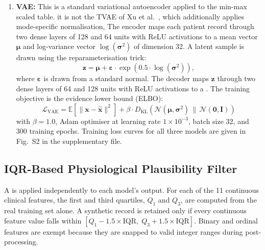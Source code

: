 \begin{enumerate}
\item {\textbf {VAE:}} This is a standard variational autoencoder applied to the min-max scaled table.  it is not the TVAE of Xu et al.\ \cite{xu2019}, which additionally applies mode-specific normalisation,  The encoder maps each patient record through two dense layers of 128 and 64 units with ReLU activations to a mean vector $\boldsymbol{\mu}$ and log-variance vector $\log(\boldsymbol{\sigma}^2)$ of dimension 32. A latent sample is drawn using the reparameterisation trick:
\begin{equation}
\mathbf{z} = \boldsymbol{\mu} + \boldsymbol{\varepsilon} \cdot \exp(0.5 \cdot \log(\boldsymbol{\sigma}^2)),
\end{equation}
where $\boldsymbol{\varepsilon}$ is drawn from a standard normal. The decoder maps $\mathbf{z}$ through two dense layers of 64 and 128 units with ReLU activations to a . The training objective is the evidence lower bound (ELBO):
\begin{equation}
\mathcal{L}_{\text{VAE}} = \mathbb{E}\!\left[\|\mathbf{x} - \hat{\mathbf{x}}\|^2\right] + \beta \cdot D_{\text{KL}}\!\left(\mathcal{N}(\boldsymbol{\mu}, \boldsymbol{\sigma}^2) \,\|\, \mathcal{N}(\mathbf{0}, \mathbf{I})\right)
\end{equation}
with $\beta = 1.0$, Adam optimiser at learning rate $1 \times 10^{-3}$, batch size 32, and 300 training epochs. Training loss curves for all three models are given in Fig.~S2 in the supplementary file. 
\end{enumerate}

\subsection{IQR-Based Physiological Plausibility Filter}

A  is applied independently to each model's output. For each of the 11 continuous clinical features, the first and third quartiles, $Q_1$ and $Q_3$, are computed from the real training set alone. A synthetic record is retained only if every continuous feature value falls within $[Q_1 - 1.5 \times \text{IQR},\; Q_3 + 1.5 \times \text{IQR}]$.  Binary and ordinal features are exempt because they are snapped to valid integer ranges during post-processing.

